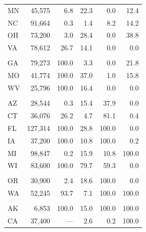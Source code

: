\begin{table}
\begin{tabular}[t]{lrrrrr}
\hspace{1em}MN & 45,575 & 6.8 & 22.3 & 0.0 & 12.4\\
\hspace{1em}NC & 91,664 & 0.3 & 1.4 & 8.2 & 14.2\\
\hspace{1em}OH & 73,200 & 3.0 & 28.4 & 0.0 & 38.8\\
\hspace{1em}VA & 78,612 & 26.7 & 14.1 & 0.0 & 0.0\\
\addlinespace[0.3em]
\multicolumn{6}{l}{\textbf{Control (Analysis)}}\\
\hspace{1em}GA & 79,273 & 100.0 & 3.3 & 0.0 & 21.8\\
\hspace{1em}MO & 41,774 & 100.0 & 37.0 & 1.0 & 15.8\\
\hspace{1em}WV & 25,796 & 100.0 & 16.4 & 0.0 & 0.0\\
\addlinespace[0.3em]
\multicolumn{6}{l}{\textbf{Excl. (Treated)}}\\
\hspace{1em}AZ & 28,544 & 0.3 & 15.4 & 37.9 & 0.0\\
\hspace{1em}CT & 36,076 & 26.2 & 4.7 & 81.1 & 0.4\\
\hspace{1em}FL & 127,314 & 100.0 & 28.8 & 100.0 & 0.0\\
\hspace{1em}IA & 37,200 & 100.0 & 10.8 & 100.0 & 0.2\\
\hspace{1em}MI & 98,847 & 0.2 & 15.9 & 10.8 & 100.0\\
\hspace{1em}WI & 83,600 & 100.0 & 79.7 & 59.3 & 0.0\\
\addlinespace[0.3em]
\multicolumn{6}{l}{\textbf{Excl. (No Fund)}}\\
\hspace{1em}OR & 30,900 & 2.4 & 18.6 & 100.0 & 0.0\\
\hspace{1em}WA & 52,245 & 93.7 & 7.1 & 100.0 & 100.0\\
\addlinespace[0.3em]
\multicolumn{6}{l}{\textbf{Remainder}}\\
\hspace{1em}AK & 6,853 & 100.0 & 15.0 & 100.0 & 100.0\\
\hspace{1em}CA & 37,400 & --- & 2.6 & 0.2 & 100.0\\

\end{tabular}
\end{table}
